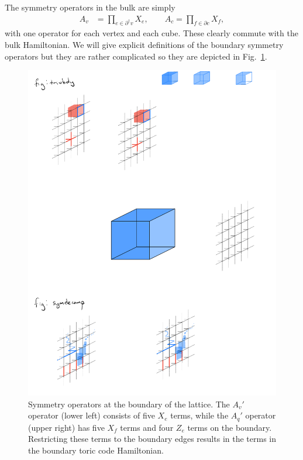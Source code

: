 \documentclass[twocolumn, longbibliography]{revtex4-2}
\newcommand{\pardag}{\partial^\dagger\!}
\begin{document}
The symmetry operators in the bulk are simply 
\begin{align}
A_v &= \prod_{e\in\pardag v} X_e,\qquad A_c = \prod_{f\in \partial c}X_f,
\end{align}
with one operator for each vertex and each cube. These clearly commute with the bulk Hamiltonian. We will give explicit definitions of the boundary symmetry operators but they are rather complicated so they are depicted  in Fig.~\ref{fig:trivbdy}.

\begin{figure}
\centering
\includegraphics{trivbdy}
\caption{Symmetry operators at the boundary of the lattice. The $A_v'$ operator (lower left) consists of five $X_e$ terms, while the $A_q'$ operator (upper right) has five $X_f$ terms and four $Z_e$ terms on the boundary. Restricting these terms to the boundary edges results in the terms in the boundary toric code Hamiltonian.}
\label{fig:trivbdy}
\end{figure}
\end{document}
